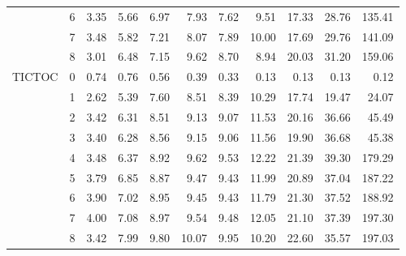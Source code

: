 \begin{tabular}{llrrrrrrrrr}
       & 6 &  3.35 &  5.66 &  6.97 &  7.93 &  7.62 &  9.51 & 17.33 & 28.76 & 135.41 \\
       & 7 &  3.48 &  5.82 &  7.21 &  8.07 &  7.89 & 10.00 & 17.69 & 29.76 & 141.09 \\
       & 8 &  3.01 &  6.48 &  7.15 &  9.62 &  8.70 &  8.94 & 20.03 & 31.20 & 159.06 \\
TICTOC & 0 &  0.74 &  0.76 &  0.56 &  0.39 &  0.33 &  0.13 &  0.13 &  0.13 &   0.12 \\
       & 1 &  2.62 &  5.39 &  7.60 &  8.51 &  8.39 & 10.29 & 17.74 & 19.47 &  24.07 \\
       & 2 &  3.42 &  6.31 &  8.51 &  9.13 &  9.07 & 11.53 & 20.16 & 36.66 &  45.49 \\
       & 3 &  3.40 &  6.28 &  8.56 &  9.15 &  9.06 & 11.56 & 19.90 & 36.68 &  45.38 \\
       & 4 &  3.48 &  6.37 &  8.92 &  9.62 &  9.53 & 12.22 & 21.39 & 39.30 & 179.29 \\
       & 5 &  3.79 &  6.85 &  8.87 &  9.47 &  9.43 & 11.99 & 20.89 & 37.04 & 187.22 \\
       & 6 &  3.90 &  7.02 &  8.95 &  9.45 &  9.43 & 11.79 & 21.30 & 37.52 & 188.92 \\
       & 7 &  4.00 &  7.08 &  8.97 &  9.54 &  9.48 & 12.05 & 21.10 & 37.39 & 197.30 \\
       & 8 &  3.42 &  7.99 &  9.80 & 10.07 &  9.95 & 10.20 & 22.60 & 35.57 & 197.03 \\
\bottomrule
\end{tabular}

